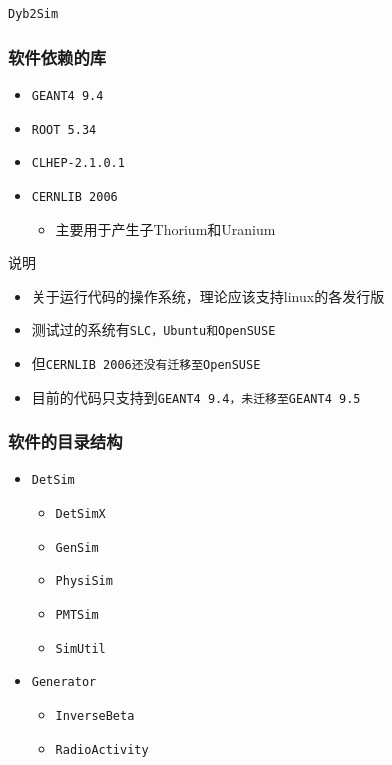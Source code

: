 
\begin{frame}
    \begin{center}
        \LARGE \tt{Dyb2Sim}
    \end{center}
\end{frame}

\begin{frame}
    \frametitle{软件依赖的库}
    \begin{itemize}
        \item \tt{GEANT4 9.4}
        \item \tt{ROOT 5.34}
        \item \tt{CLHEP-2.1.0.1}
        \item \tt{CERNLIB 2006}
            \begin{itemize}
                \item 主要用于产生子Thorium和Uranium
            \end{itemize}
    \end{itemize}
    \begin{alertblock}{说明}
    \begin{itemize}
        \item 关于运行代码的操作系统，理论应该支持linux的各发行版
        \item 测试过的系统有\tt{SLC}，\tt{Ubuntu}和\tt{OpenSUSE}
        \item 但\tt{CERNLIB 2006}还没有迁移至\tt{OpenSUSE}
        \item 目前的代码只支持到\tt{GEANT4 9.4}，未迁移至\tt{GEANT4 9.5}
    \end{itemize}
    \end{alertblock}
\end{frame}

\begin{frame}
    \frametitle{软件的目录结构}
    \begin{itemize}    
        \item \tt{DetSim}
            \begin{itemize}
                \item \tt{DetSimX}
                \item \tt{GenSim}
                \item \tt{PhysiSim}
                \item \tt{PMTSim}
                \item \tt{SimUtil}
            \end{itemize}
        \item \tt{Generator}
            \begin{itemize}
                \item \tt{InverseBeta}
                \item \tt{RadioActivity}
            \end{itemize}
    \end{itemize}
\end{frame}

